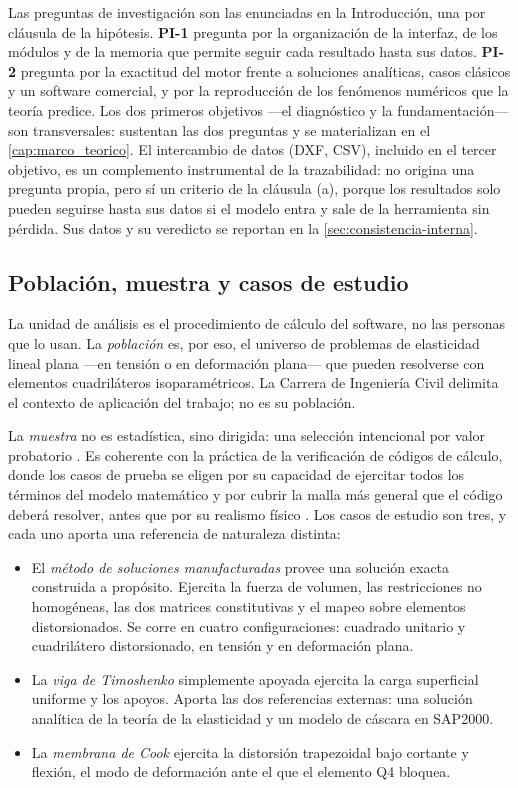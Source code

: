 Las preguntas de investigación son las enunciadas en la Introducción, una por cláusula de la hipótesis. \textbf{PI-1} pregunta por la organización de la interfaz, de los módulos y de la memoria que permite seguir cada resultado hasta sus datos. \textbf{PI-2} pregunta por la exactitud del motor frente a soluciones analíticas, casos clásicos y un software comercial, y por la reproducción de los fenómenos numéricos que la teoría predice. Los dos primeros objetivos —el diagnóstico y la fundamentación— son transversales: sustentan las dos preguntas y se materializan en el \autoref{cap:marco_teorico}. El intercambio de datos (DXF, CSV), incluido en el tercer objetivo, es un complemento instrumental de la trazabilidad: no origina una pregunta propia, pero sí un criterio de la cláusula (a), porque los resultados solo pueden seguirse hasta sus datos si el modelo entra y sale de la herramienta sin pérdida. Sus datos y su veredicto se reportan en la \autoref{sec:consistencia-interna}.

\subsection{Población, muestra y casos de estudio}
\label{sec:poblacion}

La unidad de análisis es el procedimiento de cálculo del software, no las personas que lo usan. La \emph{población} es, por eso, el universo de problemas de elasticidad lineal plana —en tensión o en deformación plana— que pueden resolverse con elementos cuadriláteros isoparamétricos. La Carrera de Ingeniería Civil delimita el contexto de aplicación del trabajo; no es su población.

La \emph{muestra} no es estadística, sino dirigida: una selección intencional por valor probatorio \autocite[p.~215]{sampieri2018metodologia}. Es coherente con la práctica de la verificación de códigos de cálculo, donde los casos de prueba se eligen por su capacidad de ejercitar todos los términos del modelo matemático y por cubrir la malla más general que el código deberá resolver, antes que por su realismo físico \autocite[pp.~190, 208]{oberkampf2010vv}. Los casos de estudio son tres, y cada uno aporta una referencia de naturaleza distinta:

\begin{itemize}
    \item El \emph{método de soluciones manufacturadas} provee una solución exacta construida a propósito. Ejercita la fuerza de volumen, las restricciones no homogéneas, las dos matrices constitutivas y el mapeo sobre elementos distorsionados. Se corre en cuatro configuraciones: cuadrado unitario y cuadrilátero distorsionado, en tensión y en deformación plana.
    \item La \emph{viga de Timoshenko} simplemente apoyada ejercita la carga superficial uniforme y los apoyos. Aporta las dos referencias externas: una solución analítica de la teoría de la elasticidad y un modelo de cáscara en SAP2000.
    \item La \emph{membrana de Cook} ejercita la distorsión trapezoidal bajo cortante y flexión, el modo de deformación ante el que el elemento Q4 bloquea.
\end{itemize}

